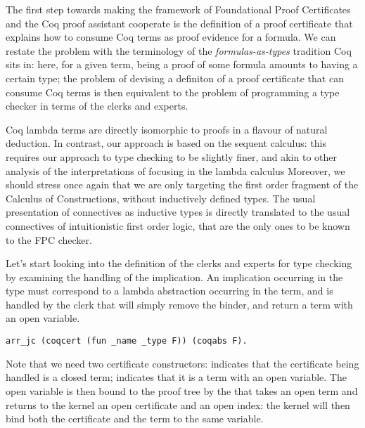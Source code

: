 \documentclass{llncs}
\begin{document}
{%

The first step towards making the framework of Foundational Proof
Certificates and the Coq proof assistant cooperate is the definition of a
proof certificate that explains how to consume Coq terms as proof evidence
for a formula. We can restate the problem with the terminology of the
\emph{formulas-as-types} tradition Coq sits in: here, for a given term, being
a proof of some formula amounts to having a certain type; the problem of
devising a definiton of a proof certificate that can consume Coq terms is
then equivalent to the problem of programming a type checker in terms of the
clerks and experts.

Coq lambda terms are directly isomorphic to proofs in a flavour of natural
deduction. In contrast, our approach is based on the sequent calculus: this
requires our approach to type checking to be slightly finer, and akin to
other analysis of the interpretations of focusing in the lambda calculus
\cite{brocknannestad15mfps} %
Moreover, we should stress once again that we are only
targeting the first order fragment of the Calculus of Constructions, without
inductively defined types. The usual presentation of connectives as inductive
types is directly translated to the usual connectives of intuitionistic first
order logic, that are the only ones to be known to the FPC checker.

Let's start looking into the definition of the clerks and experts for type
checking by examining the handling of the implication. An implication
occurring in the type must correspond to a lambda abstraction occurring in
the term, and is handled by the  clerk that will simply remove
the binder, and return a term with an open variable.

{\small
\begin{lstlisting}
arr_jc (coqcert (fun _name _type F)) (coqabs F).
\end{lstlisting} }

Note that we need two certificate constructors:  indicates that
the certificate being handled is a closed term;  indicates that
it is a term with an open variable. The open variable is then bound to the
proof tree by the  that takes an open term and returns to the
kernel an open certificate and an open index: the kernel will then bind both the
certificate and the term to the same variable.

}
\end{document}
